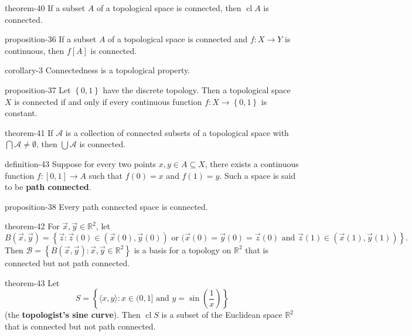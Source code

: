 \documentclass[10pt,]{article}
\newcommand{\terminology}[1]{\textbf{#1}}
\newcommand{\tuple}[1]{\langle #1 \rangle}
\newcommand{\mb}{\mathbb}
\newcommand{\mc}{\mathcal}
\newcommand{\cl}{\operatorname{cl}}
\newcommand{\setBuilder}[2]{\left\{#1:#2\right\}}
\newcommand{\setList}[1]{\left\{#1\right\}}
\begin{document}
\begin{theorem}{}{}{theorem-40}%
\hypertarget{p-163}{}%
If a subset \(A\) of a topological space is connected, then \(\cl A\) is connected.%
\end{theorem}
\begin{proposition}{}{}{proposition-36}%
\hypertarget{p-164}{}%
If a subset \(A\) of a topological space is connected and \(f:X\to Y\) is continuous, then \(f[A]\) is connected.%
\end{proposition}
\begin{corollary}{}{}{corollary-3}%
\hypertarget{p-165}{}%
Connectedness is a topological property.%
\end{corollary}
\begin{proposition}{}{}{proposition-37}%
\hypertarget{p-166}{}%
Let \(\setList{0,1}\) have the discrete topology. Then a topological space \(X\) is connected if and only if every continuous function \(f:X\to\setList{0,1}\) is constant.%
\end{proposition}
\begin{theorem}{}{}{theorem-41}%
\hypertarget{p-167}{}%
If \(\mc A\) is a collection of connected subsets of a topological space with \(\bigcap\mc A\not=\emptyset\), then \(\bigcup\mc A\) is connected.%
\end{theorem}
\begin{definition}{}{definition-43}%
\hypertarget{p-168}{}%
Suppose for every two points \(x,y\in A\subseteq X\), there exists a continuous function \(f:[0,1]\to A\) such that \(f(0)=x\) and \(f(1)=y\). Such a space is said to be \terminology{path connected}.%
\end{definition}
\begin{proposition}{}{}{proposition-38}%
\hypertarget{p-169}{}%
Every path connected space is connected.%
\end{proposition}
\begin{theorem}{}{}{theorem-42}%
\hypertarget{p-170}{}%
For \(\vec x,\vec y\in\mb R^2\), let%
\begin{equation*}
B(\vec x,\vec y)=\setBuilder{\vec z}{\vec z(0)\in(\vec x(0),\vec y(0))
\text{ or } (\vec x(0)=\vec y(0)=\vec z(0) \text{ and }
\vec z(1)\in(\vec x(1),\vec y(1))}\text{.}
\end{equation*}
Then \(\mc B=\setBuilder{B(\vec x,\vec y)}{\vec x,\vec y\in\mb R^2}\) is a basis for a topology on \(\mb R^2\) that is connected but not path connected.%
\end{theorem}
\begin{theorem}{}{}{theorem-43}%
\hypertarget{p-171}{}%
Let%
\begin{equation*}
S=
\setBuilder{\tuple{x,y}}{x\in(0,1]\text{ and }
y=\sin\left(\frac{1}{x}\right)}
\end{equation*}
(the \terminology{topologist's sine curve}). Then \(\cl S\) is a subset of the Euclidean space \(\mb R^2\) that is connected but not path connected.%
\end{theorem}
%
%
\typeout{************************************************}
\typeout{************************************************}
%
\end{document}

